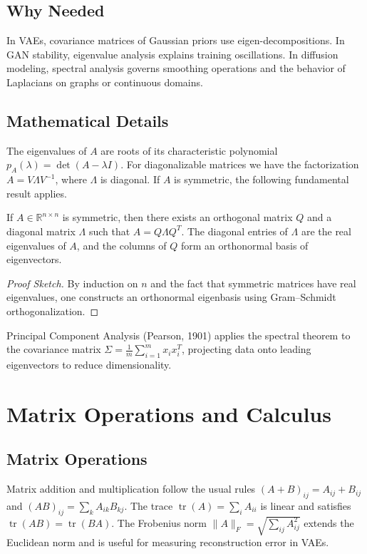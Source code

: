 \subsection{Why Needed}
In VAEs, covariance matrices of Gaussian priors use eigen-decompositions. In GAN stability, eigenvalue analysis explains training oscillations. In diffusion modeling, spectral analysis governs smoothing operations and the behavior of Laplacians on graphs or continuous domains.

\subsection{Mathematical Details}
The eigenvalues of $A$ are roots of its characteristic polynomial $p_A(\lambda)=\det(A-\lambda I)$. For diagonalizable matrices we have the factorization $A=V\Lambda V^{-1}$, where $\Lambda$ is diagonal. If $A$ is symmetric, the following fundamental result applies.

\begin{theorem}
If $A\in\mathbb{R}^{n\times n}$ is symmetric, then there exists an orthogonal matrix $Q$ and a diagonal matrix $\Lambda$ such that $A=Q\Lambda Q^T$. The diagonal entries of $\Lambda$ are the real eigenvalues of $A$, and the columns of $Q$ form an orthonormal basis of eigenvectors.
\end{theorem}
\begin{proof}[Proof Sketch]
By induction on $n$ and the fact that symmetric matrices have real eigenvalues, one constructs an orthonormal eigenbasis using Gram--Schmidt orthogonalization.
\end{proof}
Principal Component Analysis (Pearson, 1901) applies the spectral theorem to the covariance matrix $\Sigma=\tfrac1m\sum_{i=1}^m x_ix_i^T$, projecting data onto leading eigenvectors to reduce dimensionality.

\section{Matrix Operations and Calculus}
\subsection{Matrix Operations}
Matrix addition and multiplication follow the usual rules $(A+B)_{ij}=A_{ij}+B_{ij}$ and $(AB)_{ij}=\sum_k A_{ik}B_{kj}$. The trace $\operatorname{tr}(A)=\sum_i A_{ii}$ is linear and satisfies $\operatorname{tr}(AB)=\operatorname{tr}(BA)$. The Frobenius norm $\|A\|_F=\sqrt{\sum_{ij}A_{ij}^2}$ extends the Euclidean norm and is useful for measuring reconstruction error in VAEs.

